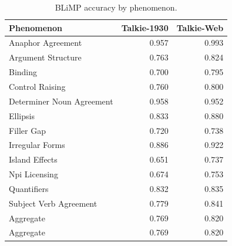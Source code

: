 \begin{table}
\caption{BLiMP accuracy by phenomenon.}
\label{tab:blimp}
\begin{tabular}{lrr}
\toprule
Phenomenon & Talkie-1930 & Talkie-Web \\
\midrule
Anaphor Agreement & 0.957 & 0.993 \\
Argument Structure & 0.763 & 0.824 \\
Binding & 0.700 & 0.795 \\
Control Raising & 0.760 & 0.800 \\
Determiner Noun Agreement & 0.958 & 0.952 \\
Ellipsis & 0.833 & 0.880 \\
Filler Gap & 0.720 & 0.738 \\
Irregular Forms & 0.886 & 0.922 \\
Island Effects & 0.651 & 0.737 \\
Npi Licensing & 0.674 & 0.753 \\
Quantifiers & 0.832 & 0.835 \\
Subject Verb Agreement & 0.779 & 0.841 \\
Aggregate & 0.769 & 0.820 \\
Aggregate & 0.769 & 0.820 \\
\bottomrule
\end{tabular}
\end{table}
